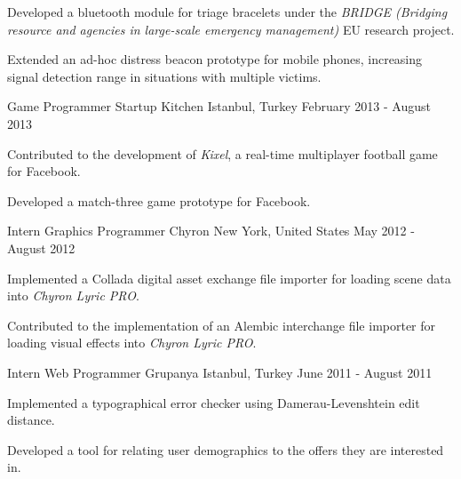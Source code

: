 \begin{cventries}
{\begin{cvitems}
        \item {Developed a bluetooth module for triage bracelets under the \textit{BRIDGE (Bridging resource and agencies in large-scale emergency management)} EU research project.}
        \item {Extended an ad-hoc distress beacon prototype for mobile phones, increasing signal detection range in situations with multiple victims.}
      \end{cvitems}
    }
  \cventry
    {Game Programmer}
    {Startup Kitchen}
    {Istanbul, Turkey}
    {February 2013 - August 2013}
    {
      \begin{cvitems}
        \item {Contributed to the development of \textit{Kixel}, a real-time multiplayer football game for Facebook.}
        \item {Developed a match-three game prototype for Facebook.}
      \end{cvitems}
    }
  \cventry
    {Intern Graphics Programmer}
    {Chyron}
    {New York, United States}
    {May 2012 - August 2012}
    {
      \begin{cvitems}
        \item {Implemented a Collada digital asset exchange file importer for loading scene data into \textit{Chyron Lyric PRO}.}
        \item {Contributed to the implementation of an Alembic interchange file importer for loading visual effects into \textit{Chyron Lyric PRO}.}
      \end{cvitems}
    }
  \cventry
    {Intern Web Programmer}
    {Grupanya}
    {Istanbul, Turkey}
    {June 2011 - August 2011}
    {
      \begin{cvitems}
        \item {Implemented a typographical error checker using Damerau-Levenshtein edit distance.}
        \item {Developed a tool for relating user demographics to the offers they are interested in.}
      \end{cvitems}
    }
\end{cventries}

